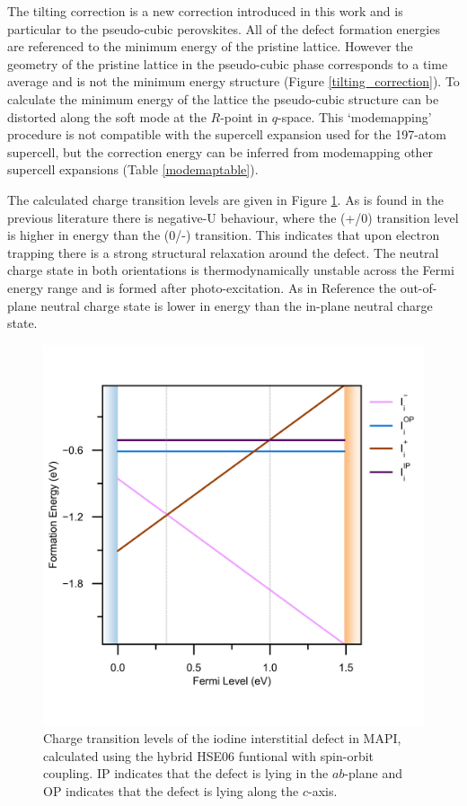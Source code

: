 The tilting correction is a new correction introduced in this work and is particular to the pseudo-cubic perovskites. All of the defect formation energies are referenced to the minimum energy of the pristine lattice. However the geometry of the pristine lattice in the pseudo-cubic phase corresponds to a time average and is not the minimum energy structure (Figure \ref{tilting_correction}). To calculate the minimum energy of the lattice the pseudo-cubic structure can be distorted along the soft mode at the $R$-point in $q$-space. This `modemapping' procedure\autocite{Skelton2016a} is not compatible with the supercell expansion used for the 197-atom supercell, but the correction energy can be inferred from modemapping other supercell expansions (Table \ref{modemaptable}).

The calculated charge transition levels are given in Figure \ref{charge_transition_diagram}. 
As is found in the previous literature\autocite{Du2015,Meggiolaro2018} there is negative-U behaviour, where the (+/0) transition level is higher in energy than the (0/-) transition. This indicates that upon electron trapping there is a strong structural relaxation around the defect. The neutral charge state in both orientations is thermodynamically unstable across the Fermi energy range and is formed after photo-excitation. As in Reference \cite{Meggiolaro2018} the out-of-plane neutral charge state is lower in energy than the in-plane neutral charge state.

\begin{figure}[h!]   
\centering
  \includegraphics[width=0.7\columnwidth]{figures/ch6/charge_transition_HSE.png}
  \caption[Charge transition levels of $\mathrm{I}_\mathrm{i}$]{Charge transition levels of the iodine interstitial defect in MAPI, calculated using the hybrid HSE06 funtional with spin-orbit coupling. IP indicates that the defect is lying in the $ab$-plane and OP indicates that the defect is lying along the $c$-axis.}
\label{charge_transition_diagram}
\end{figure}

